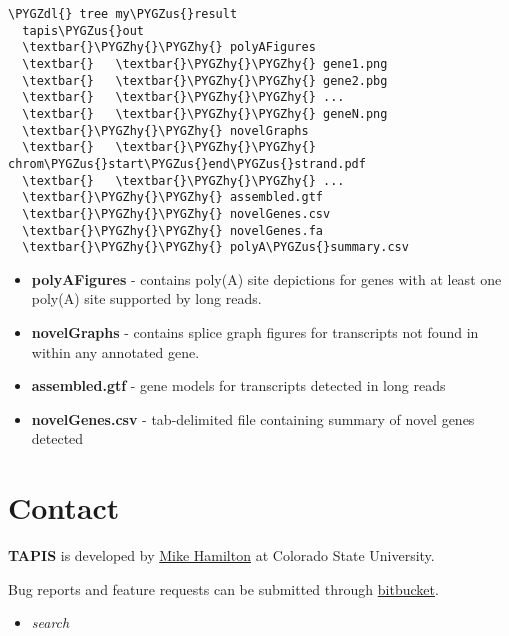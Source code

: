 \documentclass[letterpaper,10pt,english]{sphinxmanual}
\def\PYGZus{\char`\_}
\def\PYGZdl{\char`\$}
\def\PYGZhy{\char`\-}
\begin{document}
\begin{Verbatim}[commandchars=\\\{\}]
\PYGZdl{} tree my\PYGZus{}result
  tapis\PYGZus{}out
  \textbar{}\PYGZhy{}\PYGZhy{} polyAFigures
  \textbar{}   \textbar{}\PYGZhy{}\PYGZhy{} gene1.png
  \textbar{}   \textbar{}\PYGZhy{}\PYGZhy{} gene2.pbg
  \textbar{}   \textbar{}\PYGZhy{}\PYGZhy{} ...
  \textbar{}   \textbar{}\PYGZhy{}\PYGZhy{} geneN.png
  \textbar{}\PYGZhy{}\PYGZhy{} novelGraphs
  \textbar{}   \textbar{}\PYGZhy{}\PYGZhy{} chrom\PYGZus{}start\PYGZus{}end\PYGZus{}strand.pdf
  \textbar{}   \textbar{}\PYGZhy{}\PYGZhy{} ...
  \textbar{}\PYGZhy{}\PYGZhy{} assembled.gtf
  \textbar{}\PYGZhy{}\PYGZhy{} novelGenes.csv
  \textbar{}\PYGZhy{}\PYGZhy{} novelGenes.fa
  \textbar{}\PYGZhy{}\PYGZhy{} polyA\PYGZus{}summary.csv
\end{Verbatim}
\begin{itemize}
\item {} 
\textbf{polyAFigures} - contains poly(A) site depictions for genes with
at least one poly(A) site supported by long reads.

\item {} 
\textbf{novelGraphs} - contains splice graph figures for transcripts not found in within any annotated gene.

\item {} 
\textbf{assembled.gtf} - gene models for transcripts detected in long reads

\item {} 
\textbf{novelGenes.csv} - tab-delimited file containing summary of novel genes detected

\end{itemize}


\chapter{Contact}
\label{contact:contact}\label{contact::doc}
\textbf{TAPIS} is developed by \href{http://www.cs.colostate.edu/~marcel77}{Mike Hamilton} at Colorado State
University.

Bug reports and feature requests can be submitted
through \href{https://bitbucket.org/comp\_bio/tapis}{bitbucket}.
\begin{itemize}
\item {} 
\emph{search}

\end{itemize}

\begin{thebibliography}{SG}
\end{thebibliography}



\renewcommand{\indexname}{Index}
\printindex
\end{document}
